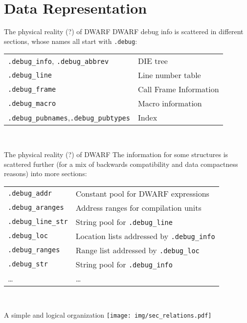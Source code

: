 
\section{Data Representation}


\begin{frame}{The physical reality (?) of DWARF}
DWARF debug info is scattered in different sections, whose names all start with \texttt{.debug}:\\
\bigskip
\begin{tabular}{ l l }
\texttt{.debug\_info}, \texttt{.debug\_abbrev} & DIE tree \\
\texttt{.debug\_line} & Line number table\\
\texttt{.debug\_frame} & Call Frame Information \\
\texttt{.debug\_macro} & Macro information \\
\texttt{.debug\_pubnames},\texttt{.debug\_pubtypes}  & Index \\
\end{tabular}\\
\end{frame}


\begin{frame}{The physical reality (?) of DWARF}
The information for some structures is \alert{scattered further} (for a mix of backwards
compatibility and data compactness reasons) into \alert{more sections}:\\
\bigskip
\begin{tabular}{ l l }
\texttt{.debug\_addr} & Constant pool for DWARF expressions\\
\texttt{.debug\_aranges} & Address ranges for compilation units\\
\texttt{.debug\_line\_str} & String pool for \texttt{.debug\_line}\\
\texttt{.debug\_loc} & Location lists addressed by \texttt{.debug\_info}\\
\texttt{.debug\_ranges} & Range list addressed by \texttt{.debug\_loc}\\
\texttt{.debug\_str} & String pool for \texttt{.debug\_info}\\
\ldots & \ldots
\end{tabular}\\
\end{frame}


\begin{frame}{A simple and logical organization}
\centering
\texttt{[image: img/sec\_relations.pdf]}
\end{frame}


